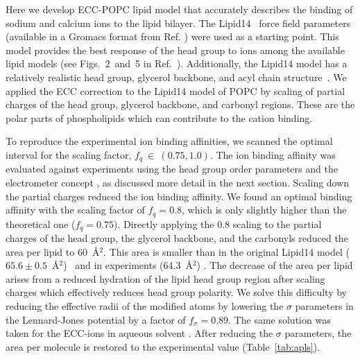 \documentclass[aip,jcp,twocolumn]{revtex4}
\begin{document}
Here we develop ECC-POPC lipid model that accurately describes the binding 
of sodium and calcium ions to the lipid bilayer. 
The Lipid14~\cite{dickson14} force field parameters 
(available in a Gromacs format from Ref. ) were used as a starting 
point. 
This model provides the best response of the head group to ions among the available 
lipid models (see Figs.~2~and~5 in Ref.~). Additionally, the Lipid14 model 
has a relatively realistic head group, glycerol backbone, and acyl chain structure~\cite{dickson14,botan15}.
We applied the ECC correction 
to the Lipid14 model of POPC by scaling of 
partial charges of the head group, glycerol 
backbone, and carbonyl regions. 
These are the polar parts of phospholipids which can 
contribute to the cation binding. 

To reproduce the experimental ion binding affinities,
we scanned the optimal interval for the scaling factor, $f_q~\in~(0.75, 1.0)$.
The ion binding affinity was evaluated against experiments
using the head group order parameters and the electrometer concept \cite{seelig87,catte16},
as discussed more detail in the next section.
Scaling down the partial charges reduced the ion binding affinity.
We found an optimal binding affinity with the scaling factor of $f_q = 0.8$,
which is only slightly higher than the theoretical one ($f_q=0.75$).
Directly applying
the 0.8 scaling to the partial charges of the head group, the glycerol backbone, and
the carbonyls reduced the area per lipid to 60~\AA$^2$. This area is smaller than in the
original Lipid14 model ($65.6 \pm 0.5$~\AA$^2$)~\cite{dickson14} and in experiments
(64.3~\AA$^2$) \cite{kucerka11}. The decrease of the area per lipid arises from a
reduced hydration of the lipid head group region after scaling charges which effectively
reduces head group polarity. We solve this difficulty by reducing the effective radii of
the modified atoms by lowering the $\sigma$ parameters in the Lennard-Jones potential by a
factor of $f_\sigma = 0.89$. The same solution was taken for the ECC-ions in aqueous
solvent \cite{kohagen14, kohagen16, Pluharova2014, martinek17}. After reducing the $\sigma$ parameters,
the area per molecule is restored to the experimental value (Table~\ref{tab:apls}). 
\end{document}
